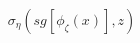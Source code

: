 \documentclass[preview]{standalone}
\begin{document}
\begin{align*}
\sigma_{\eta}(sg[\phi_\zeta (x)],z)
\end{align*}
\end{document}
